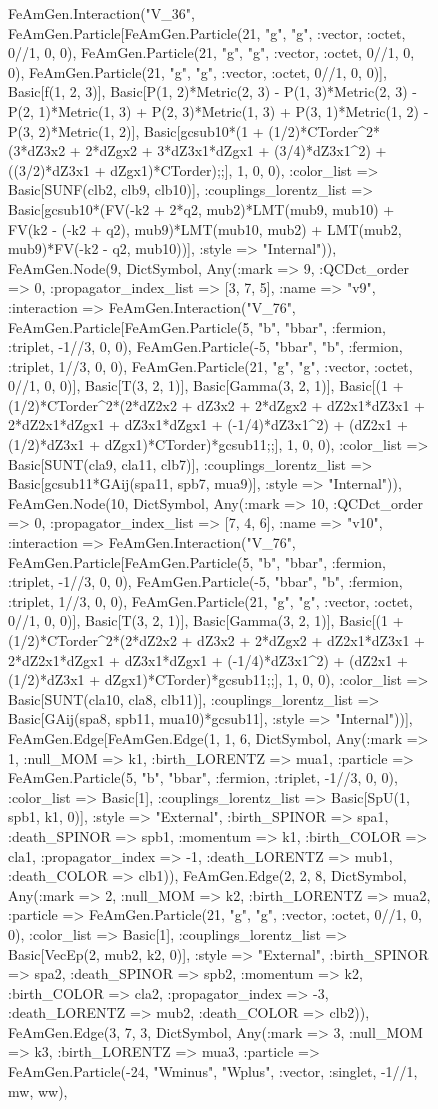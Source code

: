 \documentclass{revtex4}
\begin{document}
\begin{figure}[!htb]
\begin{center}
{FeAmGen.Interaction("V_36", FeAmGen.Particle[FeAmGen.Particle(21, "g", "g", :vector, :octet, 0//1, 0, 0), FeAmGen.Particle(21, "g", "g", :vector, :octet, 0//1, 0, 0), FeAmGen.Particle(21, "g", "g", :vector, :octet, 0//1, 0, 0)], Basic[f(1, 2, 3)], Basic[P(1, 2)*Metric(2, 3) - P(1, 3)*Metric(2, 3) - P(2, 1)*Metric(1, 3) + P(2, 3)*Metric(1, 3) + P(3, 1)*Metric(1, 2) - P(3, 2)*Metric(1, 2)], Basic[gcsub10*(1 + (1/2)*CTorder^2*(3*dZ3x2 + 2*dZgx2 + 3*dZ3x1*dZgx1 + (3/4)*dZ3x1^2) + ((3/2)*dZ3x1 + dZgx1)*CTorder);;], 1, 0, 0), :color_list => Basic[SUNF(clb2, clb9, clb10)], :couplings_lorentz_list => Basic[gcsub10*(FV(-k2 + 2*q2, mub2)*LMT(mub9, mub10) + FV(k2 - (-k2 + q2), mub9)*LMT(mub10, mub2) + LMT(mub2, mub9)*FV(-k2 - q2, mub10))], :style => "Internal")), FeAmGen.Node(9, Dict{Symbol, Any}(:mark => 9, :QCDct_order => 0, :propagator_index_list => [3, 7, 5], :name => "v9", :interaction => FeAmGen.Interaction("V_76", FeAmGen.Particle[FeAmGen.Particle(5, "b", "bbar", :fermion, :triplet, -1//3, 0, 0), FeAmGen.Particle(-5, "bbar", "b", :fermion, :triplet, 1//3, 0, 0), FeAmGen.Particle(21, "g", "g", :vector, :octet, 0//1, 0, 0)], Basic[T(3, 2, 1)], Basic[Gamma(3, 2, 1)], Basic[(1 + (1/2)*CTorder^2*(2*dZ2x2 + dZ3x2 + 2*dZgx2 + dZ2x1*dZ3x1 + 2*dZ2x1*dZgx1 + dZ3x1*dZgx1 + (-1/4)*dZ3x1^2) + (dZ2x1 + (1/2)*dZ3x1 + dZgx1)*CTorder)*gcsub11;;], 1, 0, 0), :color_list => Basic[SUNT(cla9, cla11, clb7)], :couplings_lorentz_list => Basic[gcsub11*GAij(spa11, spb7, mua9)], :style => "Internal")), FeAmGen.Node(10, Dict{Symbol, Any}(:mark => 10, :QCDct_order => 0, :propagator_index_list => [7, 4, 6], :name => "v10", :interaction => FeAmGen.Interaction("V_76", FeAmGen.Particle[FeAmGen.Particle(5, "b", "bbar", :fermion, :triplet, -1//3, 0, 0), FeAmGen.Particle(-5, "bbar", "b", :fermion, :triplet, 1//3, 0, 0), FeAmGen.Particle(21, "g", "g", :vector, :octet, 0//1, 0, 0)], Basic[T(3, 2, 1)], Basic[Gamma(3, 2, 1)], Basic[(1 + (1/2)*CTorder^2*(2*dZ2x2 + dZ3x2 + 2*dZgx2 + dZ2x1*dZ3x1 + 2*dZ2x1*dZgx1 + dZ3x1*dZgx1 + (-1/4)*dZ3x1^2) + (dZ2x1 + (1/2)*dZ3x1 + dZgx1)*CTorder)*gcsub11;;], 1, 0, 0), :color_list => Basic[SUNT(cla10, cla8, clb11)], :couplings_lorentz_list => Basic[GAij(spa8, spb11, mua10)*gcsub11], :style => "Internal"))], FeAmGen.Edge[FeAmGen.Edge(1, 1, 6, Dict{Symbol, Any}(:mark => 1, :null_MOM => k1, :birth_LORENTZ => mua1, :particle => FeAmGen.Particle(5, "b", "bbar", :fermion, :triplet, -1//3, 0, 0), :color_list => Basic[1], :couplings_lorentz_list => Basic[SpU(1, spb1, k1, 0)], :style => "External", :birth_SPINOR => spa1, :death_SPINOR => spb1, :momentum => k1, :birth_COLOR => cla1, :propagator_index => -1, :death_LORENTZ => mub1, :death_COLOR => clb1)), FeAmGen.Edge(2, 2, 8, Dict{Symbol, Any}(:mark => 2, :null_MOM => k2, :birth_LORENTZ => mua2, :particle => FeAmGen.Particle(21, "g", "g", :vector, :octet, 0//1, 0, 0), :color_list => Basic[1], :couplings_lorentz_list => Basic[VecEp(2, mub2, k2, 0)], :style => "External", :birth_SPINOR => spa2, :death_SPINOR => spb2, :momentum => k2, :birth_COLOR => cla2, :propagator_index => -3, :death_LORENTZ => mub2, :death_COLOR => clb2)), FeAmGen.Edge(3, 7, 3, Dict{Symbol, Any}(:mark => 3, :null_MOM => k3, :birth_LORENTZ => mua3, :particle => FeAmGen.Particle(-24, "Wminus", "Wplus", :vector, :singlet, -1//1, mw, ww), }
\end{center}
\end{figure}
\end{document}
